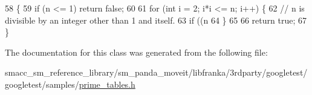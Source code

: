 \begin{DoxyCode}
58                                     \{
59     \textcolor{keywordflow}{if} (n <= 1) \textcolor{keywordflow}{return} \textcolor{keyword}{false};
60 
61     \textcolor{keywordflow}{for} (\textcolor{keywordtype}{int} i = 2; i*i <= n; i++) \{
62       \textcolor{comment}{// n is divisible by an integer other than 1 and itself.}
63       \textcolor{keywordflow}{if} ((n %
64     \}
65 
66     \textcolor{keywordflow}{return} \textcolor{keyword}{true};
67   \}
\end{DoxyCode}


The documentation for this class was generated from the following file\+:\begin{DoxyCompactItemize}
\item 
smacc\+\_\+sm\+\_\+reference\+\_\+library/sm\+\_\+panda\+\_\+moveit/libfranka/3rdparty/googletest/googletest/samples/\hyperlink{prime__tables_8h}{prime\+\_\+tables.\+h}\end{DoxyCompactItemize}
